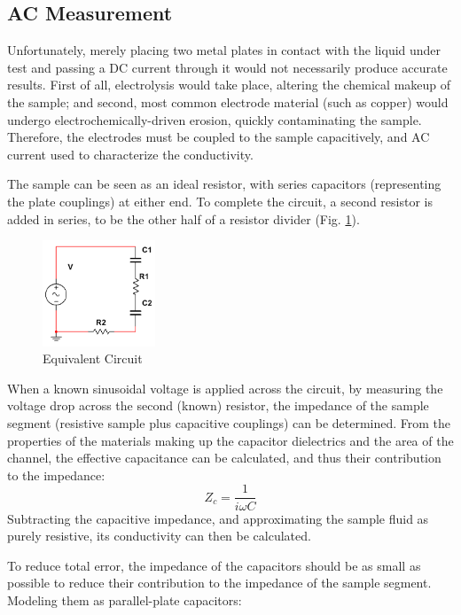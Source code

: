 \documentclass[]{article}
\begin{document}
\subsection{AC Measurement}
\par Unfortunately, merely placing two metal plates in contact with the liquid under test and passing a DC current through it would not necessarily produce accurate results. First of all, electrolysis would take place, altering the chemical makeup of the sample; and second, most common electrode material (such as copper) would undergo electrochemically-driven erosion, quickly contaminating the sample. Therefore, the electrodes must be coupled to the sample capacitively, and AC current used to characterize the conductivity. 
\par The sample can be seen as an ideal resistor, with series capacitors (representing the plate couplings) at either end. To complete the circuit, a second resistor is added in series, to be the other half of a resistor divider (Fig. \ref{fig:equivalent_circuit}).
\begin{figure}[h!]
	\centering
	\includegraphics[width=0.3\textwidth]{Conductivity_Equivalent_Circuit}
	\caption{Equivalent Circuit}
	\label{fig:equivalent_circuit}
\end{figure}
When a known sinusoidal voltage is applied across the circuit, by measuring the voltage drop across the second (known) resistor, the impedance of the sample segment (resistive sample plus capacitive couplings) can be determined. From the properties of the materials making up the capacitor dielectrics and the area of the channel, the effective capacitance can be calculated, and thus their contribution to the impedance:
\begin{equation}
Z_c=\frac{1}{i\omega C}
\end{equation}
Subtracting the capacitive impedance, and approximating the sample fluid as purely resistive, its conductivity can then be calculated.
 \par To reduce total error, the impedance of the capacitors should be as small as possible to reduce their contribution to the impedance of the sample segment. Modeling them as parallel-plate capacitors:
\end{document}
